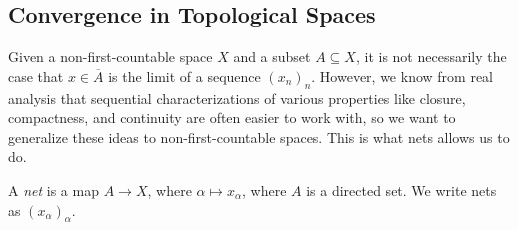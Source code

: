 \subsection{Convergence in Topological Spaces}%
Given a non-first-countable space $X$ and a subset $A\subseteq X$, it is not necessarily the case that $x\in \overline{A}$ is the limit of a sequence $\left(x_n\right)_n$. However, we know from real analysis that sequential characterizations of various properties like closure, compactness, and continuity are often easier to work with, so we want to generalize these ideas to non-first-countable spaces. This is what nets allows us to do.
\begin{definition}[Nets]
  A \textit{net} is a map $A\rightarrow X$, where $\alpha \mapsto x_{\alpha}$, where $A$ is a directed set. We write nets as $\left(x_{\alpha}\right)_{\alpha}$.
\end{definition}

